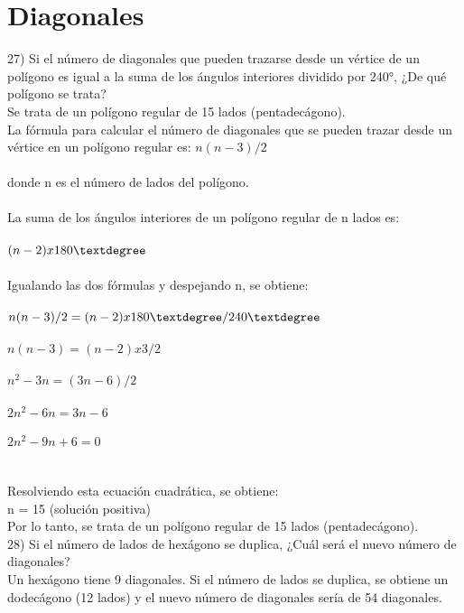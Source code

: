 \documentclass{article}
\begin{document}
\section*{\large\textbf{Diagonales}}
27) Si el número de diagonales que pueden trazarse desde un vértice de un polígono es igual a la suma de los ángulos interiores dividido por 240°, ¿De qué polígono se trata?\\
Se trata de un polígono regular de 15 lados (pentadecágono).\\
La fórmula para calcular el número de diagonales que se pueden trazar desde un vértice en un polígono regular es: $n(n-3)/2$\\
\\
donde n es el número de lados del polígono.\\
\\
La suma de los ángulos interiores de un polígono regular de n lados es:\\
\\
$(n-2) x 180\textdegree$\\
\\
Igualando las dos fórmulas y despejando n, se obtiene:\\
\\
$n(n-3)/2 = (n-2) x 180\textdegree / 240\textdegree$\\
\\
$n(n-3) = (n-2) x 3/2$\\
\\
$n^2 - 3n = (3n - 6) / 2$\\
\\
$2n^2 - 6n = 3n - 6$\\
\\
$2n^2 - 9n + 6 = 0$\\
\\
\\
Resolviendo esta ecuación cuadrática, se obtiene:\\
n = 15 (solución positiva)\\
Por lo tanto, se trata de un polígono regular de 15 lados (pentadecágono).\\



28) Si el número de lados de hexágono se duplica, ¿Cuál será el nuevo número de diagonales?\\
Un hexágono tiene 9 diagonales. Si el número de lados se duplica, se obtiene un dodecágono (12 lados) y el nuevo número de diagonales sería de 54 diagonales.\\
\end{document}
